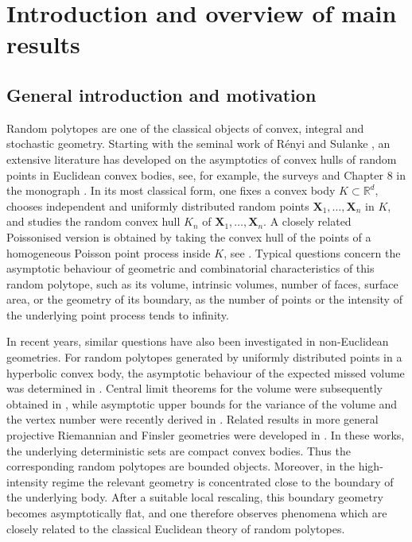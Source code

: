 \documentclass[11pt,a4paper]{article}
\theoremstyle{plain}
\theoremstyle{definition}
\theoremstyle{remark}
\def\RR{\mathbb{R}}
\def\bX{\mathbf{X}}
\begin{document}
{
\footnotesize
\tableofcontents
}

\section{Introduction and overview of main results}

\subsection{General introduction and motivation}

Random polytopes are one of the classical objects of convex, integral and stochastic
geometry. Starting with the seminal work of R\'enyi and Sulanke
\cite{RenyiSulanke1963,RenyiSulanke1964}, an extensive literature has
developed on the asymptotics of convex hulls of random points in Euclidean convex bodies,
see, for example, the surveys \cite{Barany2008, Hug2013, Reitzner2010} and Chapter 8 in the monograph
\cite{SW}. In its most classical form, one fixes a convex body
$K\subset\RR^d$, chooses independent and uniformly distributed random points $\bX_1,\ldots,\bX_n$ in $K$, and studies the random convex hull $K_n$ of $\bX_1,\ldots,\bX_n$.
A closely related Poissonised version is obtained by taking the convex hull
of the points of a homogeneous Poisson point process inside $K$, see \cite{BaranyReitzner2010}.
Typical questions
concern the asymptotic behaviour of geometric and combinatorial
characteristics of this random polytope, such as its volume, intrinsic volumes, number of
faces, surface area, or the geometry of its boundary, as the number of points
or the intensity of the underlying point process tends to infinity.

In recent years, similar questions have also been investigated in
non-Euclidean geometries. For random polytopes generated by uniformly
distributed points in a hyperbolic convex body, the asymptotic behaviour of
the expected missed volume was determined in \cite{BLW:2018}. Central limit
theorems for the volume were subsequently obtained in
\cite{BesauThaele2020}, while asymptotic upper bounds for the variance of
the volume and the vertex number were recently derived in
\cite{FodorGruenfelder2025}. Related results in more general projective
Riemannian and Finsler geometries were developed in
\cite{BLW:2018,BesauRosenThaele2021}.
In these works, the underlying deterministic
sets are compact convex bodies. Thus the corresponding random polytopes are
bounded objects. Moreover, in the high-intensity regime the relevant
geometry is concentrated close to the boundary of the underlying body. After
a suitable local rescaling, this boundary geometry becomes asymptotically
flat, and one therefore observes phenomena which are closely related to
the classical Euclidean theory of random polytopes.
\end{document}
